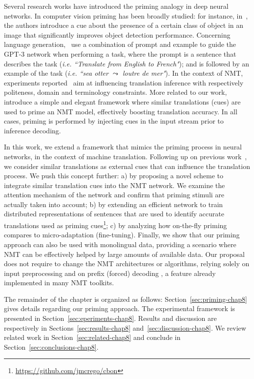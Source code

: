 Several research works have introduced the priming analogy in deep neural networks. In computer vision priming has been broadly studied: for instance, in~\citet{Rosenfeld18Priming}, the authors introduce a cue about the presence of a certain class of object in an image that significantly improves object detection performance. Concerning language generation, \citet{Brown20language}~use a combination of prompt and example to guide the GPT-3 network when performing a task, where the prompt is a sentence that describes the task ({\it i.e. ``Translate from English to French"}); and is followed by an example of the task ({\it i.e. ``sea otter $\leadsto$ loutre de mer"}). In the context of NMT, experiments reported~\cite{Sennrich16politeness,Kobus17domain,dinu19training} aim at influencing translation inference with respectively politeness, domain and terminology constraints. More related to our work,~\cite{bulte19neural,xu20boosting} introduce a simple and elegant framework where similar translations (cues) are used to prime an NMT model, effectively boosting translation accuracy.
In all cases, priming is performed by injecting cues in the input stream prior to inference decoding.

In this work, we extend a framework that mimics the priming process in neural networks, in the context of machine translation. Following up on previous work~\cite{bulte19neural,xu20boosting}, we consider similar translations as external cues that can influence the translation process. We push this concept further:
a) by proposing a novel scheme to integrate similar translation cues into the NMT network. We examine the attention mechanism of the network and confirm that priming stimuli are actually taken into account;
b) by extending an efficient network to train distributed representations of sentences
that are used to identify accurate translations used as priming cues\footnote{\url{https://github.com/jmcrego/cbon}}; 
c) by analyzing how on-the-fly priming compares to micro-adaptation (fine-tuning). 
%
Finally, we show that our priming approach can also be used with monolingual data, providing a scenario where NMT can be effectively helped by large amounts of available data.
%
Our proposal does not require to change the NMT architectures or algorithms, relying solely on input preprocessing and on prefix (forced) decoding \cite{santy19inmt,rebecca16neural}, a feature already implemented in many NMT toolkits.

The remainder of the chapter is organized as follows: Section~\ref{sec:priming-chap8} gives details regarding our priming approach. The experimental framework is presented in Section~\ref{sec:eperiments-chap8}. Results and discussion are respectively in Sections~\ref{sec:results-chap8} and~\ref{sec:discussion-chap8}. We review related work in Section~\ref{sec:related-chap8} and conclude in Section~\ref{sec:conclusions-chap8}.

